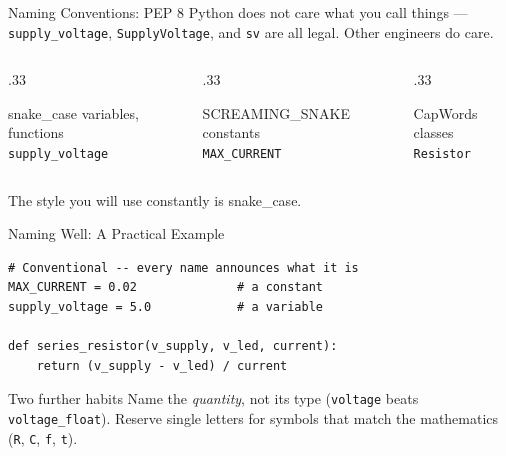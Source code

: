 \documentclass[9pt,aspectratio=169,xcolor=table]{beamer}
\begin{document}
\begin{frame}{Naming Conventions: PEP 8}
    \leavevmode
    Python does not care what you call things --- \texttt{supply\_voltage},
    \texttt{SupplyVoltage}, and \texttt{sv} are all legal. Other engineers
    \alert{do} care.

    \vspace{3mm}
    \begin{columns}[t]
        \begin{column}{.33\textwidth}
            \begin{block}{\scriptsize snake\_case}
                \scriptsize variables, functions \\
                \texttt{\scriptsize supply\_voltage}
            \end{block}
        \end{column}
        \begin{column}{.33\textwidth}
            \begin{block}{\scriptsize SCREAMING\_SNAKE}
                \scriptsize constants \\
                \texttt{\scriptsize MAX\_CURRENT}
            \end{block}
        \end{column}
        \begin{column}{.33\textwidth}
            \begin{block}{\scriptsize CapWords}
                \scriptsize classes \\
                \texttt{\scriptsize Resistor}
            \end{block}
        \end{column}
    \end{columns}

    \vspace{3mm}
    {\small The style you will use constantly is \alert{snake\_case}.}
\end{frame}

\begin{frame}[fragile]{Naming Well: A Practical Example}
    \leavevmode
\begin{lstlisting}
# Conventional -- every name announces what it is
MAX_CURRENT = 0.02              # a constant
supply_voltage = 5.0            # a variable

def series_resistor(v_supply, v_led, current):
    return (v_supply - v_led) / current
\end{lstlisting}

    \vspace{2mm}
    \begin{block}{Two further habits}
        Name the \emph{quantity}, not its type (\texttt{voltage} beats
        \texttt{voltage\_float}). Reserve single letters for symbols
        that match the mathematics (\texttt{R}, \texttt{C}, \texttt{f},
        \texttt{t}).
    \end{block}
\end{frame}
\end{document}
